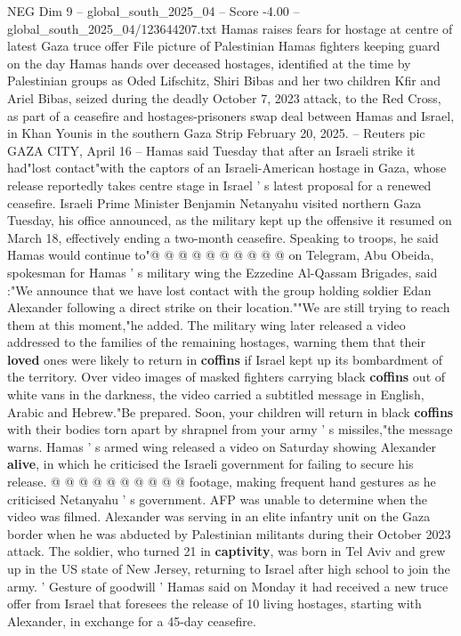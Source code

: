 \begin{textsample}{NEG Dim 9 – global\_south\_2025\_04 – Score -4.00 – global\_south\_2025\_04/123644207.txt}  \label{ex:f9_neg_297}
Hamas raises fears for hostage at centre of latest Gaza truce offer File picture of Palestinian Hamas fighters keeping guard on the day Hamas hands over deceased hostages, identified at the time by Palestinian groups as Oded Lifschitz, Shiri Bibas and her two children Kfir and Ariel Bibas, seized during the deadly October 7, 2023 attack, to the Red Cross, as part of a ceasefire and hostages-prisoners swap deal between Hamas and Israel, in Khan Younis in the southern Gaza Strip February 20, 2025. -- Reuters pic GAZA CITY, April 16 -- Hamas said Tuesday that after an Israeli strike it had"lost contact"with the captors of an Israeli-American hostage in Gaza, whose release reportedly takes centre stage in Israel ' s latest proposal for a renewed ceasefire.
Israeli Prime Minister Benjamin Netanyahu visited northern Gaza Tuesday, his office announced, as the military kept up the offensive it resumed on March 18, effectively ending a two-month ceasefire.
Speaking to troops, he said Hamas would continue to"@ @ @ @ @ @ @ @ @ @ on Telegram, Abu Obeida, spokesman for Hamas ' s military wing the Ezzedine Al-Qassam Brigades, said :"We announce that we have lost contact with the group holding soldier Edan Alexander following a direct strike on their location.""We are still trying to reach them at this moment,"he added.
The military wing later released a video addressed to the families of the remaining hostages, warning them that their \textbf{loved} ones were likely to return in \textbf{coffins} if Israel kept up its bombardment of the territory.
Over video images of masked fighters carrying black \textbf{coffins} out of white vans in the darkness, the video carried a subtitled message in English, Arabic and Hebrew."Be prepared.
Soon, your children will return in black \textbf{coffins} with their bodies torn apart by shrapnel from your army ' s missiles,"the message warns.
Hamas ' s armed wing released a video on Saturday showing Alexander \textbf{alive}, in which he criticised the Israeli government for failing to secure his release. @ @ @ @ @ @ @ @ @ @ footage, making frequent hand gestures as he criticised Netanyahu ' s government.
AFP was unable to determine when the video was filmed.
Alexander was serving in an elite infantry unit on the Gaza border when he was abducted by Palestinian militants during their October 2023 attack.
The soldier, who turned 21 in \textbf{captivity}, was born in Tel Aviv and grew up in the US state of New Jersey, returning to Israel after high school to join the army. ' Gesture of goodwill ' Hamas said on Monday it had received a new truce offer from Israel that foresees the release of 10 living hostages, starting with Alexander, in exchange for a 45-day ceasefire.

\end{textsample}
